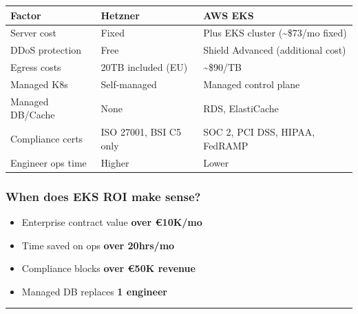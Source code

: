 {\def\LTcaptype{none} %
\begin{longtable}[]{@{}
  >{\raggedright\arraybackslash}p{}
  >{\raggedright\arraybackslash}p{}
  >{\raggedright\arraybackslash}p{}@{}}
\toprule\noalign{}
\begin{minipage}[b]{\linewidth}\raggedright
Factor
\end{minipage} & \begin{minipage}[b]{\linewidth}\raggedright
Hetzner
\end{minipage} & \begin{minipage}[b]{\linewidth}\raggedright
AWS EKS
\end{minipage} \\
\midrule\noalign{}
\endhead
\bottomrule\noalign{}
\endlastfoot
Server cost & Fixed & Plus EKS cluster (\textasciitilde\$73/mo fixed) \\
DDoS protection & Free & Shield Advanced (additional cost) \\
Egress costs & 20TB included (EU) & \textasciitilde\$90/TB \\
Managed K8s & Self-managed & Managed control plane \\
Managed DB/Cache & None & RDS, ElastiCache \\
Compliance certs & ISO 27001, BSI C5 only & SOC 2, PCI DSS, HIPAA,
FedRAMP \\
Engineer ops time & Higher & Lower \\
\end{longtable}
}

\subsubsection{When does EKS ROI make
sense?}\label{when-does-eks-roi-make-sense}

\begin{itemize}
\tightlist
\item
  Enterprise contract value \textbf{over €10K/mo}
\item
  Time saved on ops \textbf{over 20hrs/mo}
\item
  Compliance blocks \textbf{over €50K revenue}
\item
  Managed DB replaces \textbf{1 engineer}
\end{itemize}

\begin{center}\rule{0.5\linewidth}{0.5pt}\end{center}

